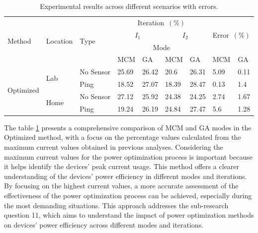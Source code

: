 \begin{longtable}{lllllllll}
  \label{tab:experimental_results}\\
  \caption{Experimental results across different scenarios with errors.}\\
  \hline\hline
  \multirow{4}{*}{Method}    & \multirow{4}{*}{Location} & \multirow{4}{*}{Type} & \multicolumn{4}{c}{Iteration~$(\%)$}                  & \multicolumn{2}{l}{\multirow{3}{*}{Error~$(\%)$}} \\*
  \cline{4-7}
                             &                           &                       & \multicolumn{2}{c}{$I_1$} & \multicolumn{2}{c}{$I_2$} & \multicolumn{2}{l}{}                              \\*
  \cline{4-7}
                             &                           &                       & \multicolumn{4}{c}{Mode}                              & \multicolumn{2}{l}{}                              \\*
  \cline{4-9}
                             &                           &                       & MCM   & GA                & MCM   & GA                & MCM  & GA                                         \\*
  \hline
  \multirow{4}{*}{Optimized} & \multirow{2}{*}{Lab}      & No Sensor             & 25.69 & 26.42             & 20.6  & 26.31             & 5.09 & 0.11                                       \\*
                             &                           & Ping                  & 18.52 & 27.07             & 18.39 & 28.47             & 0.13 & 1.4                                        \\*
  \cline{2-9}
                             & \multirow{2}{*}{Home}     & No Sensor             & 27.12 & 25.92             & 24.38 & 24.25             & 2.74 & 1.67                                       \\*
                             &                           & Ping                  & 19.24 & 26.19             & 24.84 & 27.47             & 5.6  & 1.28                                       \\
  \hline\hline
\end{longtable}

The table \ref{tab:experimental_results} presents a comprehensive comparison of MCM and GA modes in the Optimized method, with a focus on the percentage values calculated from the maximum current values obtained in previous analyses. Considering the maximum current values for the power optimization process is important because it helps identify the devices' peak current usage. This method offers a clearer understanding of the devices' power efficiency in different modes and iterations. By focusing on the highest current values, a more accurate assessment of the effectiveness of the power optimization process can be achieved, especially during the most demanding situations. This approach addresses the sub-research question 11, which aims to understand the impact of power optimization methods on devices' power efficiency across different modes and iterations.

